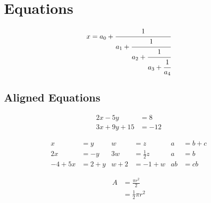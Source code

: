 \section{Equations}
\begin{equation}
x = a_0 + \cfrac{1}{a_1 
	+ \cfrac{1}{a_2 
		+ \cfrac{1}{a_3 + \cfrac{1}{a_4} } } }
\end{equation}

\subsection{Aligned Equations}
\begin{align} 
	2x - 5y &=  8 \\ 
	3x + 9y + 15 &=  -12
\end{align}


\begin{align}
	x&=y           &  w &=z              &  a&=b+c\\
	2x&=-y         &  3w&=\frac{1}{2}z   &  a&=b\\
	-4 + 5x&=2+y   &  w+2&=-1+w          &  ab&=cb
\end{align}

\begin{equation} \label{eq:eq1}
\begin{split}
A & = \frac{\pi r^2}{2} \\
& = \frac{1}{2} \pi r^2
\end{split}
\end{equation}
